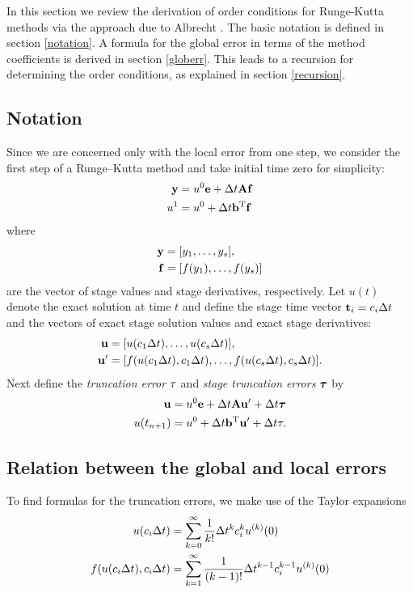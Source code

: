 In this section we review the derivation of order conditions for Runge-Kutta
methods via the approach due to Albrecht \cite{albrecht1996}.
The basic notation is defined in section \ref{notation}.  A formula 
for the global error in terms of the method coefficients is derived
in section \ref{globerr}.  This leads to a recursion for determining the order 
conditions, as explained in section \ref{recursion}.

\subsection{Notation\label{notation}}
Since we are concerned only with the local error from one step, we consider
the first step of a Runge--Kutta method and take initial time zero for simplicity:
\begin{subequations} \label{eq:rk}
\begin{align} 
\mathbf{y} & = u^0\mathbf{e} + \Delta t \mathbf{A} \mathbf{f} \\
u^{1} & = u^{0} + \Delta t \mathbf{b}^\mathrm{T} \mathbf{f}
\end{align}
\end{subequations}
where 
\begin{align*}
\mathbf{y} & = [y_1,\dots,y_s], \\
\mathbf{f} & = [f(y_1),\dots,f(y_s)]
\end{align*}
are the vector of stage values and stage derivatives, respectively.
Let $u(t)$ denote the exact solution at time $t$ and define
the stage time vector $\mathbf{t}_i = c_i\Delta t$ and
the vectors of exact stage solution values and
exact stage derivatives:
\begin{align*}
    \mathbf{u} & = [u(c_1\Delta t),\dots,u(c_s\Delta t)], \\
    \mathbf{u}' & = [f(u(c_1\Delta t),c_1\Delta t),\dots,f(u(c_s\Delta t),c_s\Delta t)].
\end{align*}
Next define the {\em truncation error} $\tau$ and
{\em stage truncation errors} $\boldsymbol{\tau}$ by
\begin{subequations} \label{eq:rk_lte}
\begin{align} 
    \mathbf{u} & = u^0 \mathbf{e} + \Delta t \mathbf{A} \mathbf{u}' + \Delta t \boldsymbol{\tau} \\
    u(t_{n+1}) & = u^0 + \Delta t \mathbf{b}^\mathrm{T}\mathbf{u}' + \Delta t \tau.
\end{align}
\end{subequations}

\subsection{Relation between the global and local errors\label{globerr}}
To find formulas for the truncation errors, we make use of 
the Taylor expansions
\begin{subequations} \label{eq:taylor}
\begin{align} 
u(c_i\Delta t) & = \sum_{k=0}^\infty \frac{1}{k!} \Delta t^k c_i^k u^{(k)}(0) \\
f(u(c_i\Delta t),c_i \Delta t) & = \sum_{k=1}^\infty \frac{1}{(k-1)!} \Delta t^{k-1} c_i^{k-1} u^{(k)}(0)
\end{align}
\end{subequations}

